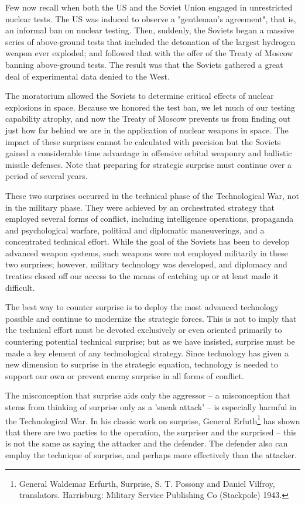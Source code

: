Few now recall when both the US and the Soviet Union engaged in unrestricted nuclear tests. The US was induced to observe a "gentleman's agreement", that is, an informal ban on nuclear testing. Then, suddenly, the Soviets began a massive series of above-ground tests that included the detonation of the largest hydrogen weapon ever exploded; and followed that with the offer of the Treaty of Moscow banning above-ground tests. The result was that the Soviets gathered a great deal of experimental data denied to the West.

The moratorium allowed the Soviets to determine critical effects of nuclear explosions in space. Because we honored the test ban, we let much of our testing capability atrophy, and now the Treaty of Moscow prevents us from finding out just how far behind we are in the application of nuclear weapons in space. The impact of these surprises cannot be calculated with precision but the Soviets gained a considerable time advantage in offensive orbital weaponry and ballistic missile defenses. Note that preparing for strategic surprise must continue over a period of several years.

These two surprises occurred in the technical phase of the Technological War, not in the military phase. They were achieved by an orchestrated strategy that employed several forms of conflict, including intelligence operations, propaganda and psychological warfare, political and diplomatic maneuverings, and a concentrated technical effort. While the goal of the Soviets has been to develop advanced weapon systems, such weapons were not employed militarily in these two surprises; however, military technology was developed, and diplomacy and treaties closed off our access to the means of catching up or at least made it difficult.

The best way to counter surprise is to deploy the most advanced technology possible and continue to modernize the strategic forces. This is not to imply that the technical effort must be devoted exclusively or even oriented primarily to countering potential technical surprise; but as we have insisted, surprise must be made a key element of any technological strategy. Since technology has given a new dimension to surprise in the strategic equation, technology is needed to support our own or prevent enemy surprise in all forms of conflict.

The misconception that surprise aids only the aggressor -- a misconception that stems from thinking of surprise only as a 'sneak attack' -- is especially harmful in the Technological War. In his classic work on surprise, General Erfuth\footnote{General Waldemar Erfurth, Surprise, S. T. Possony and Daniel Vilfroy, translators. Harrisburg: Military Service Publishing Co (Stackpole) 1943.} has shown that there are two parties to the operation, the surpriser and the surprised -- this is not the same as saying the attacker and the defender. The defender also can employ the technique of surprise, and perhaps more effectively than the attacker.

